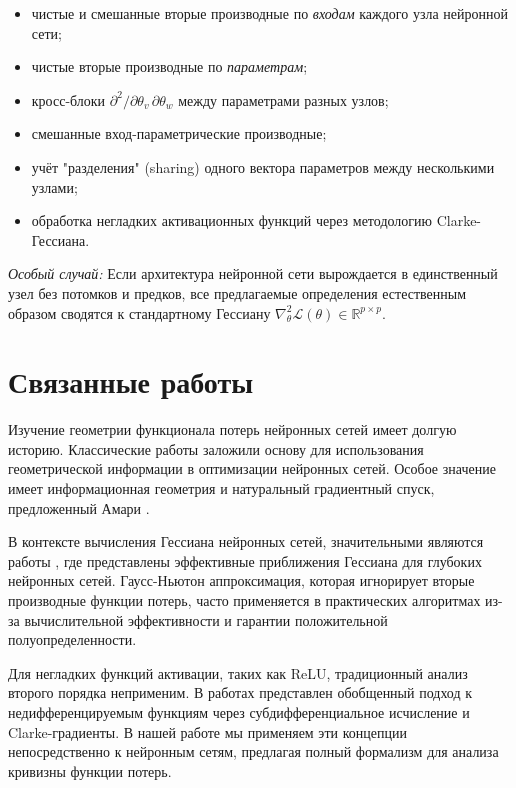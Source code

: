 \documentclass[11pt]{article}
\begin{document}
\begin{itemize}
  \item чистые и смешанные вторые производные по \emph{входам} каждого узла нейронной сети;
  \item чистые вторые производные по \emph{параметрам};
  \item кросс-блоки $\partial^2/\partial\theta_v\,\partial\theta_w$ между параметрами разных узлов;
  \item смешанные вход-параметрические производные;
  \item учёт "разделения" (sharing) одного вектора параметров между несколькими узлами;
  \item обработка негладких активационных функций через методологию Clarke-Гессиана.
\end{itemize}

\emph{Особый случай:} Если архитектура нейронной сети вырождается в единственный узел без потомков и предков,
все предлагаемые определения естественным образом сводятся к стандартному Гессиану $\nabla^2_\theta\mathcal
L(\theta)\in\mathbb{R}^{p\times p}$.

\section{Связанные работы}

Изучение геометрии функционала потерь нейронных сетей имеет долгую историю. Классические работы
\citep{amari1998natural, heskes2000natural} заложили основу для использования геометрической информации в
оптимизации нейронных сетей. Особое значение имеет информационная геометрия и натуральный градиентный спуск,
предложенный Амари \citep{amari1998natural}.

В контексте вычисления Гессиана нейронных сетей, значительными являются работы \citep{martens2010deep,
martens2012training}, где представлены эффективные приближения Гессиана для глубоких нейронных сетей.
Гаусс-Ньютон аппроксимация, которая игнорирует вторые производные функции потерь, часто применяется в
практических алгоритмах из-за вычислительной эффективности и гарантии положительной полуопределенности.

Для негладких функций активации, таких как ReLU, традиционный анализ второго порядка неприменим. В работах
\citep{clarke1990optimization, bolte2020conservative} представлен обобщенный подход к недифференцируемым
функциям через субдифференциальное исчисление и Clarke-градиенты. В нашей работе мы применяем эти концепции
непосредственно к нейронным сетям, предлагая полный формализм для анализа кривизны функции потерь.
\end{document}
